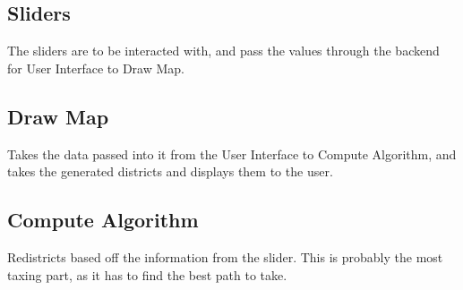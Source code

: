 \documentclass{article}
\begin{document}
\subsection{Sliders}
The sliders are to be interacted with, and pass the values through the backend for User Interface to Draw Map.

\subsection{Draw Map}
Takes the data passed into it from the User Interface to Compute Algorithm, and takes the generated districts and displays them to the user.

\subsection{Compute Algorithm}
Redistricts based off the information from the slider. This is probably the most taxing part, as it has to find the best path to take.
\end{document}
